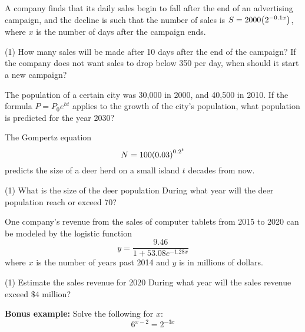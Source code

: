 \documentclass[../mathNotesPreamble]{subfiles}
\begin{document}
    \begin{ex*}
      A company finds that its daily sales begin to fall after the end of an advertising campaign, and the decline is such that the number of sales is $S=2000{\left(2^{-0.1x}\right)}$, where $x$ is the number of days after the campaign ends.
    \end{ex*}
    \begin{extasks}[after-item-skip=\stretch{0.5}](1)
      \task How many sales will be made after 10 days after the end of the campaign?
      \task If the company does not want sales to drop below 350 per day, when should it start a new campaign?
    \end{extasks}
    \pagebreak
    
    \begin{ex*}
      The population of a certain city was 30,000 in 2000, and 40,500 in 2010. If the formula $P=P_0e^{ht}$ applies to the growth of the city's population, what population is predicted for the year 2030?
    \end{ex*}
    \pagebreak
    
    \begin{ex*}
      The Gompertz equation
        \[N=100{\left(0.03\right)}^{0.2^t}\]
      predicts the size of a deer herd on a small island $t$ decades from now. 
    \end{ex*}
    \begin{extasks}[after-item-skip=\stretch{1}](1)
      \task What is the size of the deer population
      \task During what year will the deer population reach or exceed 70?
    \end{extasks}
    \pagebreak
    
    \begin{ex*}
      One company's revenue from the sales of computer tablets from 2015 to 2020 can be modeled by the logistic function
        \[y=\frac{9.46}{1+53.08e^{-1.28x}}\]
      where $x$ is the number of years past 2014 and $y$ is in millions of dollars.
    \end{ex*}
    \begin{extasks}[after-item-skip=\stretch{1}](1)
      \task Estimate the sales revenue for 2020
      \task During what year will the sales revenue exceed $\$4$ million?
    \end{extasks}
    \pagebreak
    
    \begin{ex*}
      \textbf{Bonus example: } Solve the following for $x$:
        \[6^{x-2}=2^{-3x}\]
    \end{ex*}

  \pagebreak
\end{document}
